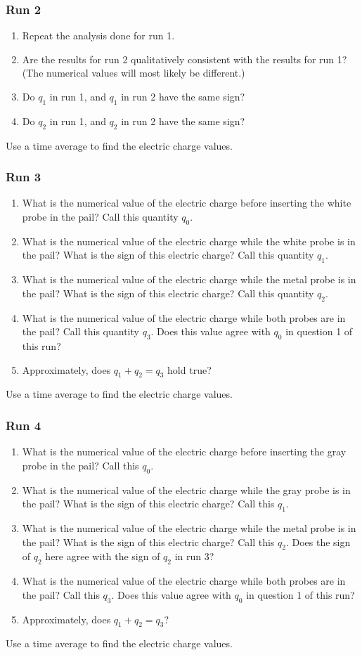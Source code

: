 \subsubsection{Run 2}
%
\begin{enumerate}
	\item Repeat the analysis done for run 1.
	\item Are the results for run 2 qualitatively consistent with the results for run 1? (The numerical values will most likely be different.)
	\item Do $q_{1}$ in run 1, and $q_{1}$ in run 2 have the same sign?
	\item Do $q_{2}$ in run 1, and $q_{2}$ in run 2 have the same sign?
\end{enumerate}
Use a time average to find the electric charge values.
%
\subsubsection{Run 3}
%
\begin{enumerate}
	\item What is the numerical value of the electric charge before inserting the white probe in the pail? Call this quantity $q_{0}$.
	\item What is the numerical value of the electric charge while the white probe is in the pail? What is the sign of this electric charge? Call this quantity $q_{1}$.
	\item What is the numerical value of the electric charge while the metal probe is in the pail? What is the sign of this electric charge? Call this quantity $q_{2}$.
	\item What is the numerical value of the electric charge while both probes are in the pail? Call this quantity $q_{3}$. Does this value agree with $q_{0}$ in question 1 of this run?
	\item Approximately, does $q_{1} + q_{2} = q_{3}$ hold true?
\end{enumerate}
Use a time average to find the electric charge values.
%
\subsubsection{Run 4}
%
\begin{enumerate}
	\item What is the numerical value of the electric charge before inserting the gray probe in the pail? Call this $q_{0}$.
	\item What is the numerical value of the electric charge while the gray probe is in the pail? What is the sign of this electric charge? Call this $q_{1}$.
	\item What is the numerical value of the electric charge while the metal probe is in the pail? What is the sign of this electric charge? Call this $q_{2}$. Does the sign of $q_{2}$ here agree with the sign of $q_{2}$ in run 3?
	\item What is the numerical value of the electric charge while both probes are in the pail? Call this $q_{3}$. Does this value agree with $q_{0}$ in question 1 of this run?
	\item Approximately, does $q_{1} + q_{2} = q_{3}$?
\end{enumerate}
Use a time average to find the electric charge values.
%
